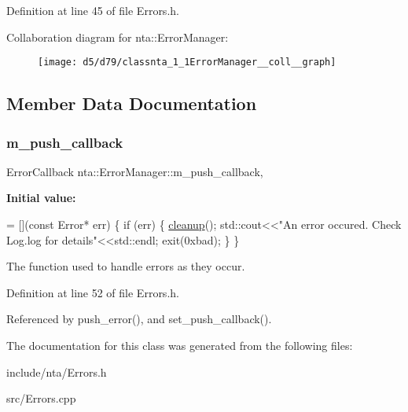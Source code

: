 Definition at line 45 of file Errors.\+h.



Collaboration diagram for nta\+:\+:Error\+Manager\+:\nopagebreak
\begin{figure}[H]
\begin{center}
\leavevmode
\texttt{[image: d5/d79/classnta\_1\_1ErrorManager\_\_coll\_\_graph]}
\end{center}
\end{figure}


\subsection{Member Data Documentation}
\mbox{\label{classnta_1_1ErrorManager_a96ac1ed4fb4ee3dd2ca4c055ccfc630c}} 
\subsubsection{\texorpdfstring{m\+\_\+push\+\_\+callback}{m\_push\_callback}}
{\footnotesize\ttfamily Error\+Callback nta\+::\+Error\+Manager\+::m\+\_\+push\+\_\+callback\hspace{0.3cm}{\ttfamily [static]}, {\ttfamily [private]}}

{\bfseries Initial value\+:}
\begin{DoxyCode}
= [](\textcolor{keyword}{const} Error* err) \{
        \textcolor{keywordflow}{if} (err) \{
            \hyperlink{namespacenta_a17dc16b021d0dec3749e422b95d39350}{cleanup}();
            std::cout<<\textcolor{stringliteral}{"An error occured. Check Log.log for details"}<<std::endl;
            exit(0xbad);
        \}
    \}
\end{DoxyCode}


The function used to handle errors as they occur. 



Definition at line 52 of file Errors.\+h.



Referenced by push\+\_\+error(), and set\+\_\+push\+\_\+callback().



The documentation for this class was generated from the following files\+:\begin{DoxyCompactItemize}
\item 
include/nta/Errors.\+h\item 
src/Errors.\+cpp\end{DoxyCompactItemize}
